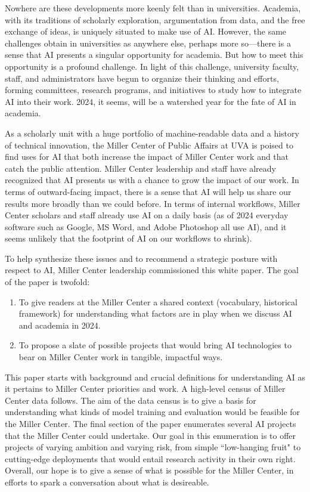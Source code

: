 \documentclass[12pt, oneside]{article}   	%
\begin{document}
Nowhere are these developments more keenly felt than in universities.  Academia, with its traditions of scholarly exploration, argumentation from data, and the free exchange of ideas, is uniquely situated to make use of AI.  However, the same challenges obtain in universities as anywhere else, perhaps more so—there is a sense that AI presents a singular opportunity for academia.  But how to meet this opportunity is a profound challenge.  In light of this challenge, university faculty, staff, and administrators have begun to organize their thinking and efforts, forming committees, research programs, and initiatives to study how to integrate AI into their work.  2024, it seems, will be a watershed year for the fate of AI in academia.

As a scholarly unit with a huge portfolio of machine-readable data and a history of technical innovation, the Miller Center of Public Affairs at UVA is poised to find uses for AI that both increase the impact of Miller Center work and that catch the public attention.   Miller Center leadership and staff have already recognized that AI presents us with a chance to grow the impact of our work.  In terms of outward-facing impact, there is a sense that AI will help us share our results more broadly than we could before.  In terms of internal workflows, Miller Center scholars and staff already use AI on a daily basis (as of 2024 everyday software such as Google, MS Word, and Adobe Photoshop all use AI), and it seems unlikely that the footprint of AI on our workflows to shrink).

To help synthesize these issues and to recommend a strategic posture with respect to AI, Miller Center leadership commissioned this white paper.  The goal of the paper is twofold:

\begin{enumerate}
\item To give readers at the Miller Center a shared context (vocabulary, historical framework) for understanding what factors are in play when we discuss AI and academia in 2024.
\item To propose a slate of possible projects that would bring AI technologies to bear on Miller Center work in tangible, impactful ways.
\end{enumerate}

This paper starts with background and crucial definitions for understanding AI as it pertains to Miller Center priorities and work.  A high-level census of Miller Center data follows.  The aim of the data census is to give a basis for understanding what kinds of model training and evaluation would be feasible for the Miller Center.  The final section of the paper enumerates several AI projects that the Miller Center could undertake.  Our goal in this enumeration is to offer projects of varying ambition and varying risk, from simple ``low-hanging fruit" to cutting-edge deployments that would entail research activity in their own right.  Overall, our hope is to give a sense of what is possible for the Miller Center, in efforts to spark a conversation about what is desireable.
\end{document}
